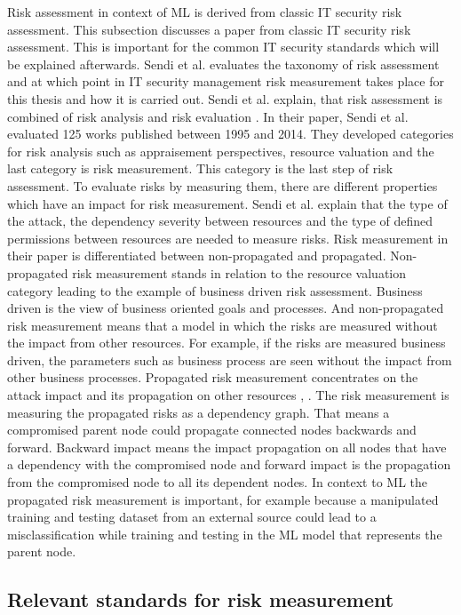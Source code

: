 Risk assessment in context of ML is derived from classic IT security risk assessment. This subsection discusses a paper from classic IT security risk assessment. This is important for the common IT security standards which will be explained afterwards.
Sendi et al. \cite{DBLP:journals/compsec/SendiAC16} evaluates the taxonomy of risk assessment and at which point in IT security management risk measurement takes place for this thesis and
how it is carried out. Sendi et al. explain, that risk assessment is combined of risk analysis and risk evaluation \cite{kersten_reuter_schroeder_wolfenstetter_2013}. In their paper, Sendi et al. evaluated 125 works published between 1995 and 2014. They developed categories for risk analysis such as appraisement perspectives,
resource valuation and the last category is risk measurement. This category is the last step of risk assessment. To evaluate risks by measuring them, there are different properties which
have an impact for risk measurement. Sendi et al. explain that the type of the attack, the dependency severity between resources and the type of defined permissions between resources are
needed to measure risks. Risk measurement in their paper is differentiated between non-propagated and propagated. Non-propagated risk measurement stands in relation to the resource
valuation category leading to the example of business driven risk assessment. Business driven is the view of business oriented goals and processes. And non-propagated risk measurement
means that a model in which the risks are measured without the impact from other resources. For example, if the risks are measured business driven, the parameters such as business process
are seen without the impact from other business processes. Propagated risk measurement concentrates on the attack impact and its propagation on other resources \cite{DBLP:conf/lcn/JahnkeTM07}, \cite{DBLP:conf/esorics/KheirCCD10}. The risk measurement is
measuring the propagated risks as a dependency graph. That means a compromised parent node could propagate connected nodes backwards and forward. Backward impact means the impact
propagation on all nodes that have a dependency with the compromised node and forward impact is the propagation from the compromised node to all its dependent nodes. In context to ML the
propagated risk measurement is important, for example because a manipulated training and testing dataset from an external source could lead to a misclassification while
training and testing in the ML model that represents the parent node.

\subsection{Relevant standards for risk measurement}

